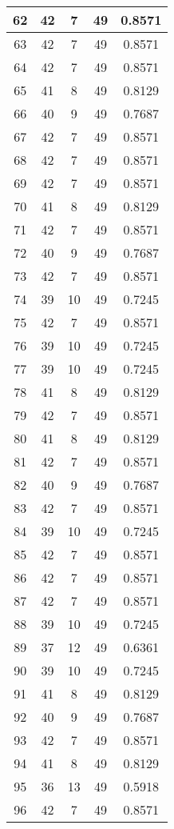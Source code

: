 \documentclass[letterpaper, 12pt]{article}
\begin{document}
\begin{longtable}{|c|c|c|c|c|}
\hline
62 & 42 & 7 & 49 & 0.8571 \\
\hline
63 & 42 & 7 & 49 & 0.8571 \\
\hline
64 & 42 & 7 & 49 & 0.8571 \\
\hline
65 & 41 & 8 & 49 & 0.8129 \\
\hline
66 & 40 & 9 & 49 & 0.7687 \\
\hline
67 & 42 & 7 & 49 & 0.8571 \\
\hline
68 & 42 & 7 & 49 & 0.8571 \\
\hline
69 & 42 & 7 & 49 & 0.8571 \\
\hline
70 & 41 & 8 & 49 & 0.8129 \\
\hline
71 & 42 & 7 & 49 & 0.8571 \\
\hline
72 & 40 & 9 & 49 & 0.7687 \\
\hline
73 & 42 & 7 & 49 & 0.8571 \\
\hline
74 & 39 & 10 & 49 & 0.7245 \\
\hline
75 & 42 & 7 & 49 & 0.8571 \\
\hline
76 & 39 & 10 & 49 & 0.7245 \\
\hline
77 & 39 & 10 & 49 & 0.7245 \\
\hline
78 & 41 & 8 & 49 & 0.8129 \\
\hline
79 & 42 & 7 & 49 & 0.8571 \\
\hline
80 & 41 & 8 & 49 & 0.8129 \\
\hline
81 & 42 & 7 & 49 & 0.8571 \\
\hline
82 & 40 & 9 & 49 & 0.7687 \\
\hline
83 & 42 & 7 & 49 & 0.8571 \\
\hline
84 & 39 & 10 & 49 & 0.7245 \\
\hline
85 & 42 & 7 & 49 & 0.8571 \\
\hline
86 & 42 & 7 & 49 & 0.8571 \\
\hline
87 & 42 & 7 & 49 & 0.8571 \\
\hline
88 & 39 & 10 & 49 & 0.7245 \\
\hline
89 & 37 & 12 & 49 & 0.6361 \\
\hline
90 & 39 & 10 & 49 & 0.7245 \\
\hline
91 & 41 & 8 & 49 & 0.8129 \\
\hline
92 & 40 & 9 & 49 & 0.7687 \\
\hline
93 & 42 & 7 & 49 & 0.8571 \\
\hline
94 & 41 & 8 & 49 & 0.8129 \\
\hline
95 & 36 & 13 & 49 & 0.5918 \\
\hline
96 & 42 & 7 & 49 & 0.8571 \\

\end{longtable}
\end{document}
